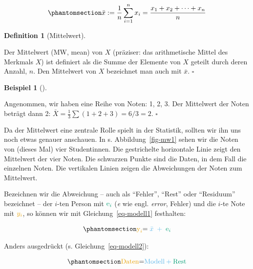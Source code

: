\documentclass[
  letterpaper,
  twoside,
  open=any]{scrbook}
\theoremstyle{definition}
\theoremstyle{definition}
\newtheorem{example}{Beispiel}[chapter]
\theoremstyle{definition}
\newtheorem{definition}{Definition}[chapter]
\theoremstyle{remark}
\begin{document}
\begin{equation}\phantomsection\label{eq-mw-formel}{\bar {x} :=\frac{1}{n} \sum_{i=1}^{n}{x_{i}}=\frac {x_{1}+x_{2}+\dotsb +x_{n}} {n}}\end{equation}

\begin{definition}[Mittelwert]\protect\hypertarget{def-mw}{}\label{def-mw}

Der Mittelwert (MW, mean) von \(X\) (präziser: das arithmetische Mittel
des Merkmals \(X\)) ist definiert als die Summe der Elemente von \(X\)
geteilt durch deren Anzahl, \(n\). Den Mittelwert von \(X\) bezeichnet
man auch mit \(\bar {x}\). \(\square\)

\end{definition}

\begin{example}[]\protect\hypertarget{exm-mw1}{}\label{exm-mw1}

Angenommen, wir haben eine Reihe von Noten: 1, 2, 3. Der Mittelwert der
Noten beträgt dann 2: \(\bar{X} = \frac{1}{3}\sum (1+2+3) = 6/3 = 2\).
\(\square\)

\end{example}

Da der Mittelwert eine zentrale Rolle spielt in der Statistik, sollten
wir ihn uns noch etwas genauer anschauen. In s. Abbildung~\ref{fig-mw1}
sehen wir die Noten von (dieses Mal) vier Studentinnen. Die gestrichelte
horizontale Linie zeigt den Mittelwert der vier Noten. Die schwarzen
Punkte sind die Daten, in dem Fall die einzelnen Noten. Die vertikalen
Linien zeigen die Abweichungen der Noten zum Mittelwert.

Bezeichnen wir die Abweichung -- auch als \enquote{Fehler},
\enquote{Rest} oder \enquote{Residuum} bezeichnet -- der \(i\)-ten
Person mit \(\color{errorcol}{\text{e}_i}\) (\emph{e} wie engl.
\emph{error}, Fehler) und die \(i\)-te Note mit \(\color{ycol}{y_i}\),
so können wir mit Gleichung~\ref{eq-modell1} festhalten:

\begin{equation}\phantomsection\label{eq-modell1}{\color{ycol}{\text{y}_i} \color{black}{ = } \color{modelcol}{\;\bar{x}\;} + \color{errorcol}{\;\text{e}_i}}\end{equation}

Anders ausgedrückt (s. Gleichung~\ref{eq-modell2}):

\begin{equation}\phantomsection\label{eq-modell2}{\color{ycol}{\text{Daten}} \color{black}{ = } \color{modelcol}{\text{Modell}} + 
\color{errorcol}{\text{Rest}}}\end{equation}
\end{document}
